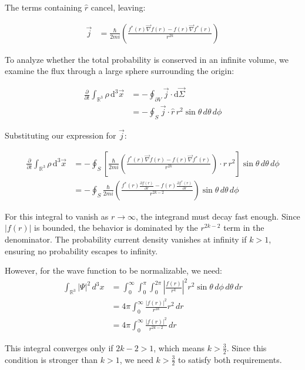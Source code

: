\documentclass[italian]{HKNdocument}
\begin{document}
The terms containing $\hat{r}$ cancel, leaving:

\begin{align}
\vec{j} &= \frac{\hbar}{2 m i}\left(\frac{f^{*}(r) \vec{\nabla} f(r)-f(r) \vec{\nabla} f^{*}(r)}{r^{2 k}}\right)
\end{align}

To analyze whether the total probability is conserved in an infinite volume, we examine the flux through a large sphere surrounding the origin:

\begin{align}
\frac{\partial}{\partial t} \int_{\mathbb{R}^{3}} \rho \, \mathrm{d}^{3} \vec{x} &= -\oint_{\partial V} \vec{j} \cdot \mathrm{d} \vec{\Sigma} \\
&= -\oint_{S} \vec{j} \cdot \hat{r} \, r^{2} \sin\theta \, d\theta \, d\phi
\end{align}

Substituting our expression for $\vec{j}$:

\begin{align}
\frac{\partial}{\partial t} \int_{\mathbb{R}^{3}} \rho \, \mathrm{d}^{3} \vec{x} &= -\oint_{S}\left[\frac{\hbar}{2 m i}\left(\frac{f^{*}(r) \vec{\nabla} f(r)-f(r) \vec{\nabla} f^{*}(r)}{r^{2 k}}\right) \cdot \hat{r} \, r^{2}\right] \sin\theta \, d\theta \, d\phi  \\
&= -\oint_{S} \frac{\hbar}{2 m i}\left(\frac{f^{*}(r) \frac{\partial f(r)}{\partial r}-f(r) \frac{\partial f^{*}(r)}{\partial r}}{r^{2 k-2}}\right) \sin\theta \, d\theta \, d\phi
\end{align}

For this integral to vanish as $r \to \infty$, the integrand must decay fast enough. Since $|f(r)|$ is bounded, the behavior is dominated by the $r^{2k-2}$ term in the denominator. The probability current density vanishes at infinity if $k > 1$, ensuring no probability escapes to infinity.

However, for the wave function to be normalizable, we need:
\begin{align}
\int_{\mathbb{R}^{3}} |\Psi|^2 \, d^3x &= \int_0^\infty \int_0^\pi \int_0^{2\pi} \left|\frac{f(r)}{r^k}\right|^2 r^2 \sin\theta \, d\phi \, d\theta \, dr \\
&= 4\pi \int_0^\infty \frac{|f(r)|^2}{r^{2k}} r^2 \, dr \\
&= 4\pi \int_0^\infty \frac{|f(r)|^2}{r^{2k-2}} \, dr
\end{align}

This integral converges only if $2k-2 > 1$, which means $k > \frac{3}{2}$. Since this condition is stronger than $k > 1$, we need $k > \frac{3}{2}$ to satisfy both requirements.
\end{document}
